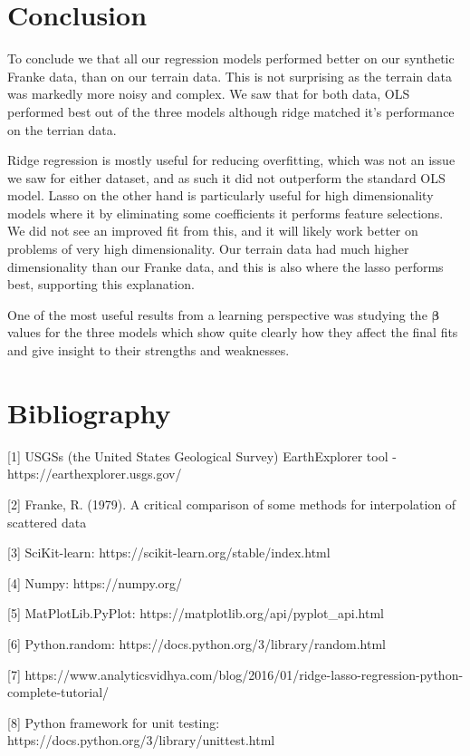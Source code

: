\documentclass[11pt]{article}
\makeatletter
\newcommand{\boxspacing}{\kern\kvtcb@left@rule\kern\kvtcb@boxsep}
\newcommand{\prompt}[4]{
        \ttfamily\llap{{\color{#2}[#3]:\hspace{3pt}#4}}\vspace{-\baselineskip}
    }
\makeatother
\begin{document}
    \hypertarget{conclusion}{%
\section{Conclusion}\label{conclusion}}

To conclude we that all our regression models performed better on our
synthetic Franke data, than on our terrain data. This is not surprising
as the terrain data was markedly more noisy and complex. We saw that for
both data, OLS performed best out of the three models although ridge
matched it's performance on the terrian data.

Ridge regression is mostly useful for reducing overfitting, which was
not an issue we saw for either dataset, and as such it did not
outperform the standard OLS model. Lasso on the other hand is
particularly useful for high dimensionality models where it by
eliminating some coefficients it performs feature selections. We did not
see an improved fit from this, and it will likely work better on
problems of very high dimensionality. Our terrain data had much higher
dimensionality than our Franke data, and this is also where the lasso
performs best, supporting this explanation.

One of the most useful results from a learning perspective was studying
the \(\boldsymbol{\beta}\) values for the three models which show quite
clearly how they affect the final fits and give insight to their
strengths and weaknesses.

    \hypertarget{bibliography}{%
\section{Bibliography}\label{bibliography}}

{[}1{]} USGSs (the United States Geological Survey) EarthExplorer tool -
https://earthexplorer.usgs.gov/

{[}2{]} Franke, R. (1979). A critical comparison of some methods for
interpolation of scattered data

{[}3{]} SciKit-learn: https://scikit-learn.org/stable/index.html

{[}4{]} Numpy: https://numpy.org/

{[}5{]} MatPlotLib.PyPlot: https://matplotlib.org/api/pyplot\_api.html

{[}6{]} Python.random: https://docs.python.org/3/library/random.html

{[}7{]}
https://www.analyticsvidhya.com/blog/2016/01/ridge-lasso-regression-python-complete-tutorial/

{[}8{]} Python framework for unit testing:
https://docs.python.org/3/library/unittest.html

    \begin{tcolorbox}[breakable, size=fbox, boxrule=1pt, pad at break*=1mm,colback=cellbackground, colframe=cellborder]
\prompt{In}{incolor}{ }{\boxspacing}
\begin{Verbatim}[commandchars=\\\{\}]

\end{Verbatim}
\end{tcolorbox}


    
    
    
\end{document}
